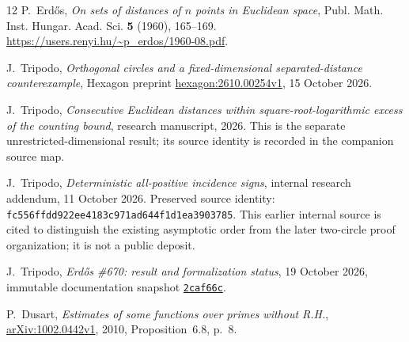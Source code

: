 \documentclass[11pt]{article}
\numberwithin{equation}{section}
\theoremstyle{definition}\newtheorem{definition}[theorem]{Definition}
\theoremstyle{remark}\newtheorem{remark}[theorem]{Remark}
\begin{document}
\begin{thebibliography}{12}
P.~Erd\H{o}s,
\emph{On sets of distances of $n$ points in Euclidean space},
Publ. Math. Inst. Hungar. Acad. Sci. \textbf{5} (1960), 165--169.
\url{https://users.renyi.hu/~p_erdos/1960-08.pdf}.


J.~Tripodo, \emph{Orthogonal circles and a fixed-dimensional
separated-distance counterexample}, Hexagon preprint
\href{https://hexagonmath.org/2610.00254?version=1}{hexagon:2610.00254v1},
15 October 2026.

J.~Tripodo, \emph{Consecutive Euclidean distances within
square-root-logarithmic excess of the counting bound}, research manuscript, 2026. This is the separate unrestricted-dimensional
result; its source identity is recorded in the companion source map.

J.~Tripodo, \emph{Deterministic all-positive incidence signs},
internal research addendum, 11 October 2026.
Preserved source identity: \texttt{fc556ffdd922ee4183c971ad644f1d1ea3903785}.
This earlier internal source is cited to distinguish the existing asymptotic
order from the later two-circle proof organization; it is not a public deposit.

J.~Tripodo, \emph{Erd\H{o}s \#670: result and formalization status},
19 October 2026, immutable documentation snapshot
\href{https://github.com/jjtripodo-lgtm/erdos-670-fixed-dimension/blob/2caf66c312c5d498d17e1c150588684b66300e68/PUBLIC_STATUS.md}{\texttt{2caf66c}}.

P.~Dusart, \emph{Estimates of some functions over primes without R.H.},
\href{https://arxiv.org/abs/1002.0442v1}{arXiv:1002.0442v1}, 2010,
Proposition~6.8, p.~8.

\end{thebibliography}
\end{document}
